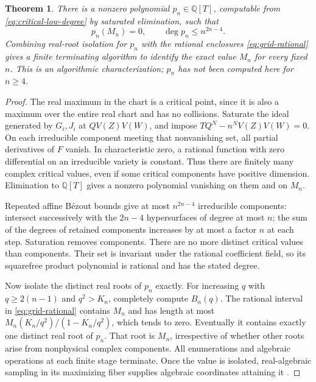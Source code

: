 \documentclass[11pt]{article}
\newtheorem{theorem}{Theorem}[section]
\theoremstyle{remark}
\newcommand{\Q}{\mathbb Q}
\numberwithin{equation}{section}
\begin{document}
\begin{theorem}\label{thm:exact-algorithm}
There is a nonzero polynomial $p_n\in\Q[T]$, computable from
\eqref{eq:critical-low-degree} by saturated elimination, such that
\begin{equation}\label{eq:degree-bound}
 p_n(M_n)=0,\qquad \deg p_n\le n^{2n-4}.
\end{equation}
Combining real-root isolation for $p_n$ with the rational enclosures
\eqref{eq:grid-rational} gives a finite terminating algorithm to
identify the exact value $M_n$ for every fixed $n$.
This is an algorithmic characterization; $p_n$ has not been computed
here for $n\ge4$.
\end{theorem}
\begin{proof}
The real maximum in the chart is a critical point, since it is also
a maximum over the entire real chart and has no collisions.
Saturate the ideal generated by $G_i,J_i$ at $QV(Z)V(W)$, and impose
$TQ^N-n^NV(Z)V(W)=0$.
On each irreducible component meeting that nonvanishing set, all
partial derivatives of $F$ vanish. In characteristic zero, a rational
function with zero differential on an irreducible variety is constant.
Thus there are finitely many complex critical values, even if some
critical components have positive dimension. Elimination to $\Q[T]$
gives a nonzero polynomial vanishing on them and on $M_n$.

Repeated affine B\'ezout bounds give at most $n^{2n-4}$ irreducible
components: intersect successively with the $2n-4$ hypersurfaces of
degree at most $n$; the sum of the degrees of retained components
increases by at most a factor $n$ at each step. Saturation removes
components. There are no more distinct critical values than components.
Their set is invariant under the rational coefficient field, so its
squarefree product polynomial is rational and has the stated degree.

Now isolate the distinct real roots of $p_n$ exactly. For increasing
$q$ with $q\ge2(n-1)$ and $q^2>K_n$, completely compute $B_n(q)$.
The rational interval in \eqref{eq:grid-rational} contains $M_n$ and
has length at most $M_n(K_n/q^2)/(1-K_n/q^2)$, which tends to zero.
Eventually it contains exactly one distinct real root of $p_n$.
That root is $M_n$, irrespective of whether other roots arise from
nonphysical complex components. All enumerations and algebraic
operations at each finite stage terminate. Once the value is isolated,
real-algebraic sampling in its maximizing fiber supplies algebraic
coordinates attaining it \cite{Basu}.
\end{proof}
\end{document}
